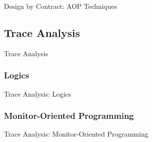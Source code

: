 \documentclass[12pt]{beamer}
\begin{document}
\begin{frame}{Design by Contract: AOP Techniques}

\end{frame}


\subsection{Trace Analysis}
\label{sec:runver-trace}

\begin{frame}{Trace Analysis}

\end{frame}

\subsubsection{Logics}
\label{sec:runver-trace-log}

\begin{frame}{Trace Analysis: Logics}

\end{frame}

\subsubsection{Monitor-Oriented Programming}
\label{sec:runver-trace-mop}

\begin{frame}{Trace Analysis: Monitor-Oriented Programming}

\end{frame}

\end{document}
